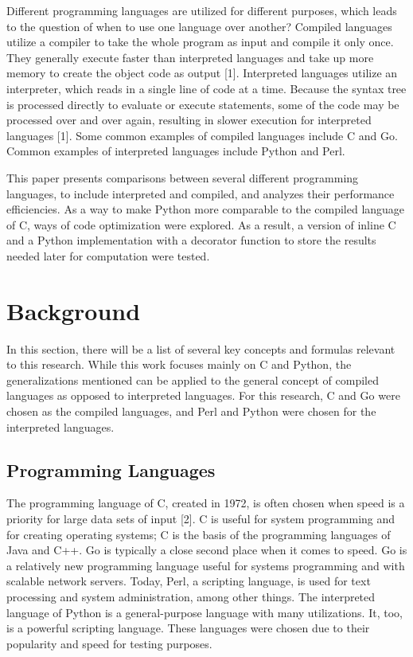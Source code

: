 \documentclass{sig-alternate}
\begin{document}
Different programming languages are utilized for different purposes, which leads to the question of when to use one language over another? Compiled languages utilize a compiler to take the whole program as input and compile it only once. They generally execute faster than interpreted languages and take up more memory to create the object code as output [1]. Interpreted languages utilize an interpreter, which reads in a single line of code at a time. Because the syntax tree is processed directly to evaluate or execute statements, some of the code may be processed over and over again, resulting in slower execution for interpreted languages [1]. Some common examples of compiled languages include C and Go. Common examples of interpreted languages include Python and Perl. 

This paper presents comparisons between several different programming languages, to include interpreted and compiled, and analyzes their performance efficiencies. As a way to make Python more comparable to the compiled language of C, ways of code optimization were explored. As a result, a version of inline C and a Python implementation with a decorator function to store the results needed later for computation were tested.

\section{Background}

In this section, there will be a list of several key concepts and formulas relevant to this research. While this work focuses mainly on C and Python, the generalizations mentioned can be applied to the general concept of compiled languages as opposed to interpreted languages. For this research, C and Go were chosen as the compiled languages, and Perl and Python were chosen for the interpreted languages. 

\subsection{Programming Languages}	

The programming language of C, created in 1972, is often chosen when speed is a priority for large data sets of input [2]. C is useful for system programming and for creating operating systems; C is the basis of the programming languages of Java and C++. Go is typically a close second place when it comes to speed. Go is a relatively new programming language useful for systems programming and with scalable network servers. Today, Perl, a scripting language, is used for text processing and system administration, among other things. The interpreted language of Python is a general-purpose language with many utilizations. It, too, is a powerful scripting language. These languages were chosen due to their popularity and speed for testing purposes.
\end{document}
